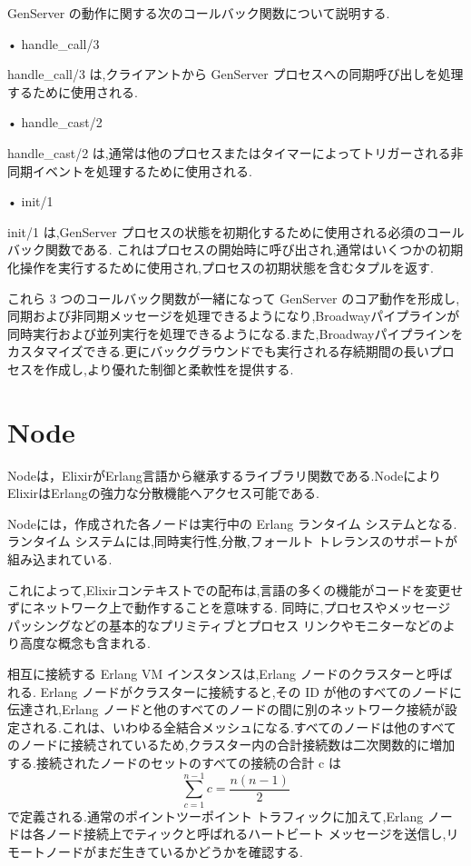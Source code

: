 \documentclass[a4paper]{jreport}	%
\begin{document}
GenServer の動作に関する次のコールバック関数について説明する.

• handle\_call/3

handle\_call/3 は,クライアントから GenServer プロセスへの同期呼び出しを処理するために使用される.

• handle\_cast/2

handle\_cast/2 は,通常は他のプロセスまたはタイマーによってトリガーされる非同期イベントを処理するために使用される.

• init/1

init/1 は,GenServer プロセスの状態を初期化するために使用される必須のコールバック関数である. これはプロセスの開始時に呼び出され,通常はいくつかの初期化操作を実行するために使用され,プロセスの初期状態を含むタプルを返す.


これら 3 つのコールバック関数が一緒になって GenServer のコア動作を形成し,同期および非同期メッセージを処理できるようになり,Broadwayパイプラインが同時実行および並列実行を処理できるようになる.また,Broadwayパイプラインをカスタマイズできる.更にバックグラウンドでも実行される存続期間の長いプロセスを作成し,より優れた制御と柔軟性を提供する.


\section{Node}
Nodeは，ElixirがErlang言語から継承するライブラリ関数である\cite{H}.NodeによりElixirはErlangの強力な分散機能へアクセス可能である\cite{J}.

Nodeには，作成された各ノードは実行中の Erlang ランタイム システムとなる.ランタイム システムには,同時実行性,分散,フォールト トレランスのサポートが組み込まれている.

これによって,Elixirコンテキストでの配布は,言語の多くの機能がコードを変更せずにネットワーク上で動作することを意味する. 同時に,プロセスやメッセージ パッシングなどの基本的なプリミティブとプロセス リンクやモニターなどのより高度な概念も含まれる.

相互に接続する Erlang VM インスタンスは,Erlang ノードのクラスターと呼ばれる. Erlang ノードがクラスターに接続すると,その ID が他のすべてのノードに伝達され,Erlang ノードと他のすべてのノードの間に別のネットワーク接続が設定される.これは、いわゆる全結合メッシュになる.すべてのノードは他のすべてのノードに接続されているため,クラスター内の合計接続数は二次関数的に増加する.接続されたノードのセットのすべての接続の合計 c は \[ \sum_{c=1}^{n-1}c = \frac{n(n-1)}2\]で定義される.通常のポイントツーポイント トラフィックに加えて,Erlang ノードは各ノード接続上でティックと呼ばれるハートビート メッセージを送信し,リモートノードがまだ生きているかどうかを確認する.
\end{document}
